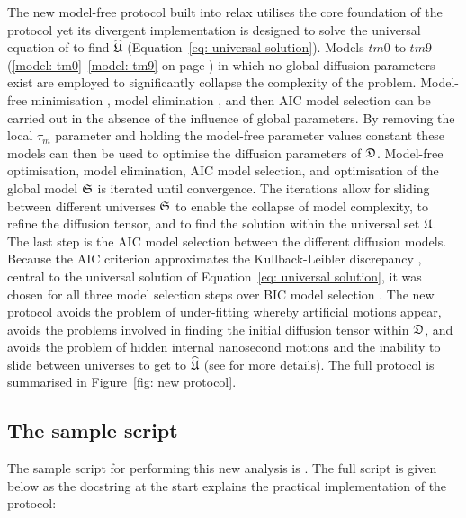 \begin{htmlonly}
\begin{htmlonly}
The new model-free protocol built into relax utilises the core foundation of the \citet{Butterwick04} protocol yet its divergent implementation is designed to solve the universal equation of \citet{dAuvergneGooley07} to find $\widehat{\mathfrak{U}}$ (Equation~\ref{eq: universal solution}).  Models $tm0$ to $tm9$ (\ref{model: tm0}--\ref{model: tm9} on page \pageref{model: tm0}) in which no global diffusion parameters exist are employed to significantly collapse the complexity of the problem.  Model-free minimisation \citep{dAuvergneGooley08a}, model elimination \citep{dAuvergneGooley06}, and then AIC model selection \citep{Akaike73, dAuvergneGooley03} can be carried out in the absence of the influence of global parameters.  By removing the local $\tau_m$ parameter and holding the model-free parameter values constant these models can then be used to optimise the diffusion parameters of $\mathfrak{D}$.  Model-free optimisation, model elimination, AIC model selection, and optimisation of the global model $\mathfrak{S}$ is iterated until convergence.  The iterations allow for sliding between different universes $\mathfrak{S}$ to enable the collapse of model complexity, to refine the diffusion tensor, and to find the solution within the universal set $\mathfrak{U}$.  The last step is the AIC model selection between the different diffusion models.  Because the AIC criterion approximates the Kullback-Leibler discrepancy \citep{KullbackLeibler51}, central to the universal solution of Equation~\eqref{eq: universal solution}, it was chosen for all three model selection steps over BIC model selection \citep{Schwarz78, dAuvergneGooley03, Chen04}.  The new protocol avoids the problem of under-fitting whereby artificial motions appear, avoids the problems involved in finding the initial diffusion tensor within $\mathfrak{D}$, and avoids the problem of hidden internal nanosecond motions and the inability to slide between universes to get to $\widehat{\mathfrak{U}}$ (see \citet{dAuvergneGooley07} for more details).  The full protocol is summarised in Figure~\ref{fig: new protocol}.




\subsection{The sample script}

The sample script for performing this new analysis is .  The full script is given below as the docstring at the start explains the practical implementation of the protocol:


\end{htmlonly}
\end{htmlonly}
